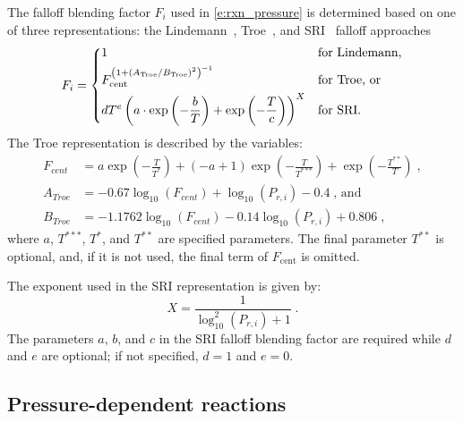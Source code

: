\documentclass[12pt,number,sort&compress]{elsarticle}
\begin{document}
The falloff blending factor $F_i$ used in \cref{e:rxn_pressure} is determined based on one of three representations: the Lindemann~\cite{Lindemann:1922cz}, Troe~\cite{Gilbert:1983bb}, and SRI~\cite{Stewart:1989gj} falloff approaches
\begin{equation}
\label{e:fi}
F_i = \begin{dcases}
1 &\text{for Lindemann,} \\
F_{\text{cent}}^{ \left( 1 + ( A_{\text{Troe}} / B_{\text{Troe}} )^2 \right)^{-1} } &\text{for Troe, or} \\
d T^e \left( a \cdot \exp \left( -\frac{b}{T} \right) + \exp \left( -\frac{T}{c} \right) \right)^X &\text{for SRI.}
\end{dcases}
\end{equation}
The Troe representation is described by the variables:
\begin{align}
 F_{cent} &= a \operatorname{exp}\left({- \frac{T}{T^{*}}}\right) + \left(- a + 1\right) \operatorname{exp}\left({- \frac{T}{T^{***}}}\right) + \operatorname{exp}\left({- \frac{T^{**}}{T}}\right) \;, \\
 A_{Troe} &= - 0.67 \log_{10}{\left (F_{cent} \right )} + \log_{10}{\left (P_{r, i} \right )} - 0.4 \;\text{, and}\\
 B_{Troe} &= - 1.1762 \log_{10}{\left (F_{cent} \right )} - 0.14 \log_{10}{\left (P_{r, i} \right )} + 0.806 \;,
\end{align}
where $a$, $T^{***}$, $T^*$, and $T^{**}$ are specified parameters.
The final parameter $T^{**}$ is optional, and, if it is not used, the final term of $F_{\text{cent}}$ is omitted.

The exponent used in the SRI representation is given by:
\begin{equation}
 X = \frac{1}{\log_{10}^{2}{\left (P_{r, i} \right )} + 1}\;.
\end{equation}
The parameters $a$, $b$, and $c$ in the SRI falloff blending factor are required while $d$ and $e$ are optional; if not specified, $d = 1$ and $e = 0$.

\subsection{Pressure-dependent reactions}
\label{s:pdep}
\end{document}
